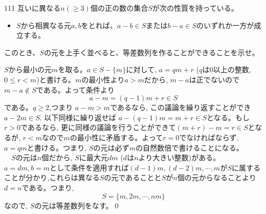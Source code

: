 \begin{prob}{111}{}{}
 互いに異なる$n (\ge 3)$個の正の数の集合$S$が次の性質を持っている。
 \begin{itemize}
  \item[性質:] $S$から相異なる元$a, b$をとれば、$a-b\in S$または$b-a\in S$のいずれか一方が成立する。
 \end{itemize}
 このとき、$S$の元を上手く並べると、等差数列を作ることができることを示せ。
\end{prob}
$S$から最小の元$m$を取る。$a\in S-\{m\}$に対して, $a=qm+r$  ($q$は0以上の整数, $0\leq r<m$)と書ける。$m$の最小性より$a>m$だから, $m-a$は正でないので$m-a\notin S$である。よって条件より
\[a-m=(q-1)m+r\in S\]
である。$q\geq 2$,つまり $a-m>m$であるなら, この議論を繰り返すことができ$a-2m\in S$. 以下同様に繰り返せば $a-(q-1)m=m+r\in S$となる。もし$r>0$であるなら, 更に同様の議論を行うことができて$(m+r)-m=r\in S$となるが, $r<m$なので$m$の最小性に矛盾する。よって$r=0$でなければならず, $a=qm$と書ける。つまり, $S$の元は必ず$m$の自然数倍で書けることになる。\\
　$S$の元は$n$個だから, $S$に最大元$dm$ ($d$は$n$より大きい整数)がある。$a=dm, b=m$として条件を適用すれば$(d-1)m,(d-2)m,\cdots, m$が$S$に属することが分かり,これらは異なる$S$の元であることと$S$が$n$個の元からなることより$d=n$である。つまり,
\[S=\{m,2m,\cdots, nm\}\]
なので, $S$の元は等差数列をなす。\qed